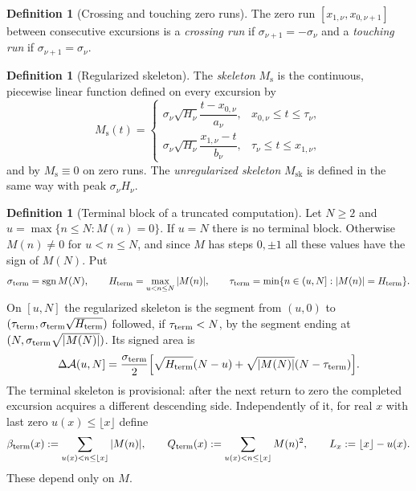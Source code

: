 \documentclass[11pt]{amsart}
\numberwithin{equation}{section}
\theoremstyle{plain}
\theoremstyle{definition}
\newtheorem{definition}[theorem]{Definition}
\theoremstyle{remark}
\DeclareMathOperator{\sgn}{sgn}
\newcommand{\Ms}{M_{\mathrm{s}}}
\newcommand{\Msk}{M_{\mathrm{sk}}}
\newcommand{\Anet}{\mathcal{A}}
\begin{document}
\begin{definition}[Crossing and touching zero runs]
\label{def:crossing_touching}
The zero run $[x_{1,\nu},x_{0,\nu+1}]$ between consecutive excursions is a
\emph{crossing run} if $\sigma_{\nu+1}=-\sigma_\nu$ and a \emph{touching run}
if $\sigma_{\nu+1}=\sigma_\nu$.
\end{definition}

\begin{definition}[Regularized skeleton]
\label{def:Ms}
The \emph{skeleton} $\Ms$ is the continuous, piecewise linear function
defined on every excursion by
\begin{equation}
\label{eq:Ms_def}
\Ms(t)=
\begin{cases}
\sigma_\nu\sqrt{H_\nu}\dfrac{t-x_{0,\nu}}{a_\nu},
 &x_{0,\nu}\le t\le\tau_\nu,\\[2ex]
\sigma_\nu\sqrt{H_\nu}\dfrac{x_{1,\nu}-t}{b_\nu},
 &\tau_\nu\le t\le x_{1,\nu},
\end{cases}
\end{equation}
and by $\Ms\equiv0$ on zero runs. The \emph{unregularized skeleton} $\Msk$
is defined in the same way with peak $\sigma_\nu H_\nu$.
\end{definition}

\begin{definition}[Terminal block of a truncated computation]
\label{def:Ms-terminal}
Let $N\ge2$ and $u=\max\{n\le N:M(n)=0\}$. If $u=N$ there is no terminal
block. Otherwise $M(n)\ne0$ for $u<n\le N$, and since $M$ has steps
$0,\pm1$ all these values have the sign of $M(N)$. Put
\[
\sigma_{\rm term}=\sgn M(N),\qquad
H_{\rm term}=\max_{u<n\le N}|M(n)|,\qquad
\tau_{\rm term}=\min\{n\in(u,N]:|M(n)|=H_{\rm term}\}.
\]
On $[u,N]$ the regularized skeleton is the segment from $(u,0)$ to
$(\tau_{\rm term},\sigma_{\rm term}\sqrt{H_{\rm term}})$ followed, if
$\tau_{\rm term}<N$, by the segment ending at
$(N,\sigma_{\rm term}\sqrt{|M(N)|})$. Its signed area is
\[
\Delta\Anet(u,N]=\frac{\sigma_{\rm term}}2
\Bigl[\sqrt{H_{\rm term}}(N-u)+
\sqrt{|M(N)|}(N-\tau_{\rm term})\Bigr].
\]
The terminal skeleton is provisional: after the next return to zero the
completed excursion acquires a different descending side. Independently of
it, for real $x$ with last zero $u(x)\le\lfloor x\rfloor$ define
\[
\beta_{\rm term}(x):=\sum_{u(x)<n\le\lfloor x\rfloor}|M(n)|,\qquad
Q_{\rm term}(x):=\sum_{u(x)<n\le\lfloor x\rfloor}M(n)^2,\qquad
L_x:=\lfloor x\rfloor-u(x).
\]
These depend only on $M$.
\end{definition}
\end{document}
